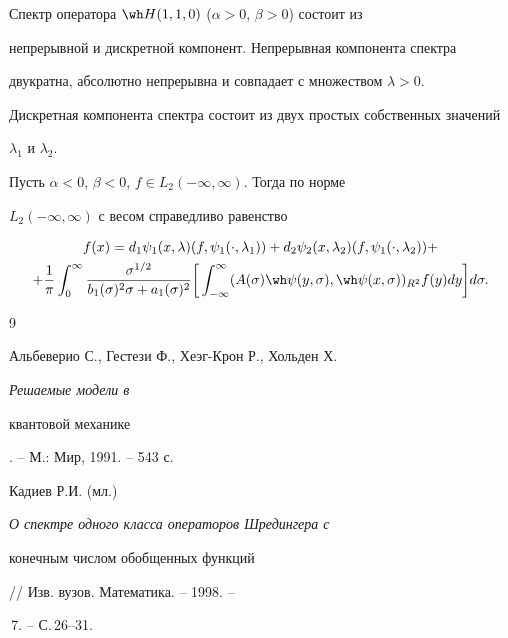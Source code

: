  


\begin{cor} 


Спектр оператора $\wh H(1,1,0)$ ($\alpha>0$, $\beta>0$) состоит из 


непрерывной и дискретной компонент. Непрерывная компонента спектра 


двукратна, абсолютно непрерывна и совпадает с множеством $\lambda>0$. 


Дискретная компонента спектра состоит из двух простых собственных значений 


$\lambda_1$ и $\lambda_2$. 


\end{cor} 


 


\begin{cor} 


Пусть $\alpha<0$, $\beta<0$, $f\in L_2(-\infty,\infty)$. Тогда по норме 


$L_2(-\infty,\infty)$ с весом справедливо равенство 


\begin{multline*} 


f(x)=d_1\psi_1(x,\lambda)(f,\psi_1(\cdot,\lambda_1))+ 


d_2\psi_2(x,\lambda_2)(f,\psi_1(\cdot,\lambda_2))+ \\ 


% 


+\frac{1}{\pi}\int^\infty_0 


\frac{\sigma^{1/2}}{b_1(\sigma)^2\sigma+a_1(\sigma)^2}\bigg[ 


\int^\infty_{-\infty}(A(\sigma)\wh\psi(y,\sigma), 


\wh\psi(x,\sigma))_{R^2}f(y)dy\bigg]d\sigma. 


\end{multline*} 


\end{cor} 


 


 


\begin{thebibliography}{9} 


 




Альбеверио С., Гестези Ф., Хеэг-Крон Р., Хольден Х. {\em Решаемые модели в 


квантовой механике}. -- М.: Мир, 1991. -- 543 с. 




Кадиев Р.И. (мл.) {\em О спектре одного класса операторов Шредингера с 


конечным числом обобщенных функций} // Изв. вузов. Математика. -- 1998. -- 


\No\,7. -- С.\,26--31. 


 


\end{thebibliography} 


